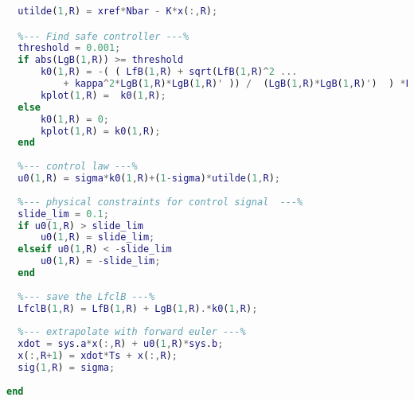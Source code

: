 \begin{lstlisting}[language=matlab]
  %-- Find controller by pole placement --%
  utilde(1,R) = xref*Nbar - K*x(:,R);

  %--- Find safe controller ---%
  threshold = 0.001;
  if abs(LgB(1,R)) >= threshold
      k0(1,R) = -( ( LfB(1,R) + sqrt(LfB(1,R)^2 ...
          + kappa^2*LgB(1,R)*LgB(1,R)' )) /  (LgB(1,R)*LgB(1,R)')  ) *LgB(1,R);
      kplot(1,R) =  k0(1,R);
  else
      k0(1,R) = 0;
      kplot(1,R) = k0(1,R);
  end 
  
  %--- control law ---%
  u0(1,R) = sigma*k0(1,R)+(1-sigma)*utilde(1,R);
  
  %--- physical constraints for control signal  ---%
  slide_lim = 0.1;
  if u0(1,R) > slide_lim
      u0(1,R) = slide_lim;
  elseif u0(1,R) < -slide_lim
      u0(1,R) = -slide_lim;
  end
 
  %--- save the LfclB ---%
  LfclB(1,R) = LfB(1,R) + LgB(1,R).*k0(1,R);
  
  %--- extrapolate with forward euler ---%
  xdot = sys.a*x(:,R) + u0(1,R)*sys.b;
  x(:,R+1) = xdot*Ts + x(:,R);
  sig(1,R) = sigma;
  
end
\end{lstlisting}